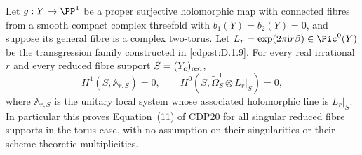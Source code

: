 
\begin{proposition}\label{cdp:st:A.4.8}
Let $g:Y\to\PP^1$ be a proper surjective holomorphic map with connected fibres from a smooth compact complex threefold with $b_1(Y)=b_2(Y)=0$, and suppose its general fibre is a complex two-torus. Let $L_r=\exp(2\pi\mathrm i r\beta)\in\Pic^0(Y)$ be the transgression family constructed in \ref{cdp:st:D.1.9}. For every real irrational $r$ and every reduced fibre support $S=(Y_c)_{\rm red}$,
\[
 H^1(S,\mathbb A_{r,S})=0,
 \qquad
 H^0(S,\widetilde\Omega_S^1\otimes L_r|_S)=0,
 \tag{A.21}\label{cdp:eq:A.21}
\]
where $\mathbb A_{r,S}$ is the unitary local system whose associated holomorphic line is $L_r|_S$. In particular this proves Equation~(11) of CDP20 for all singular reduced fibre supports in the torus case, with no assumption on their singularities or their scheme-theoretic multiplicities.
\end{proposition}
